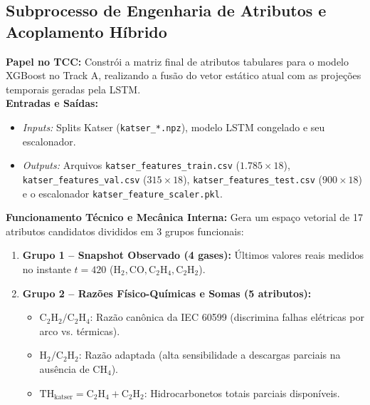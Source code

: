 \documentclass[10pt,a4paper]{article}
\begin{document}
\subsection{Subprocesso de Engenharia de Atributos e Acoplamento Híbrido}

\begin{filebox}
\textbf{Papel no TCC:} Constrói a matriz final de atributos tabulares para o modelo XGBoost no Track A, realizando a fusão do vetor estático atual com as projeções temporais geradas pela LSTM.\\
\textbf{Entradas e Saídas:}
\begin{itemize}[leftmargin=*,itemsep=1pt]
  \item \textit{Inputs:} Splits Katser (\texttt{katser\_*.npz}), modelo LSTM congelado e seu escalonador.
  \item \textit{Outputs:} Arquivos \texttt{katser\_features\_train.csv} ($1.785 \times 18$), \texttt{katser\_features\_val.csv} ($315 \times 18$), \texttt{katser\_features\_test.csv} ($900 \times 18$) e o escalonador \texttt{katser\_feature\_scaler.pkl}.
\end{itemize}
\textbf{Funcionamento Técnico e Mecânica Interna:} 
Gera um espaço vetorial de 17 atributos candidatos divididos em 3 grupos funcionais:
\begin{enumerate}[leftmargin=*,itemsep=1pt]
  \item \textbf{Grupo 1 -- Snapshot Observado (4 gases):} Últimos valores reais medidos no instante $t=420$ ($\text{H}_2, \text{CO}, \text{C}_2\text{H}_4, \text{C}_2\text{H}_2$).
  \item \textbf{Grupo 2 -- Razões Físico-Químicas e Somas (5 atributos):}
    \begin{itemize}[leftmargin=*,itemsep=0pt]
      \item $\text{C}_2\text{H}_2 / \text{C}_2\text{H}_4$: Razão canônica da IEC 60599 (discrimina falhas elétricas por arco vs. térmicas).
      \item $\text{H}_2 / \text{C}_2\text{H}_2$: Razão adaptada (alta sensibilidade a descargas parciais na ausência de $\text{CH}_4$).
      \item $\text{TH}_{\text{katser}} = \text{C}_2\text{H}_4 + \text{C}_2\text{H}_2$: Hidrocarbonetos totais parciais disponíveis.

\end{itemize}
\end{enumerate}
\end{filebox}
\end{document}
